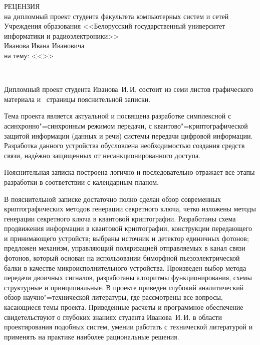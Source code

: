
\thispagestyle{empty}

%

\begin{singlespace}

{\small
  \begin{center}
    \begin{minipage}{0.9\textwidth}
      \begin{center}
        {\normalsize РЕЦЕНЗИЯ}\\[0.2cm]
        на дипломный проект студента факультета компьютерных систем и сетей Учреждения образования <<Белорусский государственный университет информатики и радиоэлектроники>>\\
        Иванова Ивана Ивановича\\
        на тему: <<\topicName>>
      \end{center}
    \end{minipage}\\
  \end{center}

Дипломный проект студента Иванова~И.\,И. состоит из семи листов графического материала и~\pageref*{LastPage} страницы пояснительной записки.

Тема проекта является актуальной и посвящена разработке симплексной с асинхронно"=синхронным режимом передачи, с квантово"=криптографической защитой информации (данных и речи) системы передачи цифровой информации.
Разработка данного устройства обусловлена необходимостью создания средств связи, надѐжно защищенных от несанкционированного доступа.

Пояснительная записка построена логично и последовательно отражает все этапы разработки в соответствии с календарным планом.

В пояснительной записке достаточно полно сделан обзор современных криптографических методов генерации секретного ключа, четко изложены методы генерации секретного
ключа в квантовой криптографии.
Разработаны схема продвижения информации в квантовой криптографии, конструкции передающего и принимающего устройств; выбраны источник и детектор единичных фотонов; предложен механизм, управляющий поляризацией отправляемых в канал связи фотонов, который основан на использовании биморфной пьезоэлектрической балки в качестве микроисполнительного устройства.
Произведен выбор метода передачи двоичных сигналов, разработаны алгоритмы функционирования, схемы структурные и принципиальные.
В проекте приведен глубокий аналитический обзор научно"=технической литературы, где рассмотрены все вопросы, касающиеся темы проекта.
Приведенные расчеты и программное обеспечение свидетельствуют о глубоких знаниях студента Иванова~И.\,И. в области проектирования подобных систем, умении работать с технической литературой и применять на практике наиболее рациональные решения.

}
\end{singlespace}
